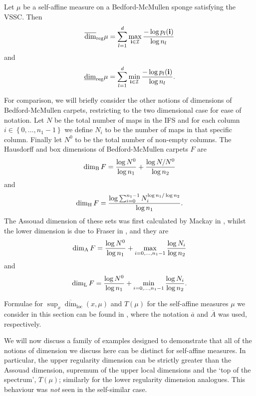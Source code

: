 \begin{theorem}\label{ch-upper-reg:carpet}
	Let $\mu$ be a self-affine measure on a Bedford-McMullen sponge satisfying the VSSC.  Then
	\[
	\overline{\dim}_{\textup{reg}} \mu =\sum_{l=1}^d \max_{\mathbf{i}\in \mathcal{I}}\frac{-\log p_l(\mathbf{i})}{\log n_l}
	\]
	and 
	\[
	\underline{\dim}_{\textup{reg}} \mu =\sum_{l=1}^d \min_{\mathbf{i}\in \mathcal{I}}\frac{-\log p_l(\mathbf{i})}{\log n_l}.
	\]
\end{theorem}

For comparison, we will briefly consider the other notions of dimensions of Bedford-McMullen carpets, restricting to the two dimensional case for ease of notation. Let $N$ be the total number of maps in the IFS and for each column $i\in \left\{0,\ldots, n_1 - 1\right\}$ we define $N_i$ to be the number of maps in that specific column. Finally let $N^0$ to be the total number of non-empty columns. The Hausdorff and box dimensions of Bedford-McMullen carpets $F$ are 
\[
\dim_{\textup{B}} F = \frac{\log N^0}{\log n_1} + \frac{\log N/N^0}{\log n_2}
\]
and 
\[
\dim_{\textup{H}} F = \frac{\log \sum_{i=0}^{n_1 - 1} N_i^{\log n_1 / \log n_2} }{\log n_1}.
\]
The Assouad dimension of these sets was first calculated by Mackay in \cite{mackay}, whilst the lower dimension is due to Fraser in \cite{fraser}, and they are
\[
\dim_{\textup{A}} F = \frac{\log N^0}{\log n_1} + \max_{i = 0, \ldots, n_1-1} \frac{\log N_i}{\log n_2}
\]
and 
\[
\dim_{\textup{L}} F = \frac{\log N^0}{\log n_1} + \min_{i = 0, \ldots, n_1-1} \frac{\log N_i}{\log n_2}.
\]


Formulae for $\sup_x \overline{\dim}_{\text{loc}}(x,\mu)$ and $T(\mu)$ for the self-affine measures $\mu$ we consider in this section can be found in \cite{sponges}, where the notation $\overline{a}$ and $\overline{A}$ was used, respectively.


We will now discuss a family of examples designed to demonstrate that all of the notions of dimension we discuss here can be distinct for self-affine measures.  In particular, the upper regularity dimension can be strictly greater than the Assouad dimension, supremum of the upper local dimensions and the `top of the spectrum', $T(\mu)$; similarly for the lower regularity dimension analogues.  This behaviour was \emph{not} seen in the self-similar case.

